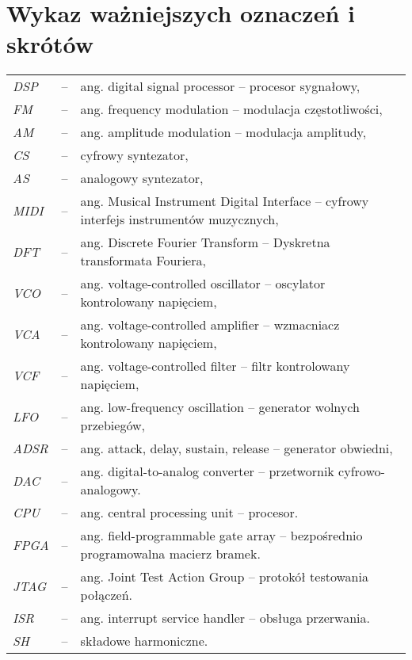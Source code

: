 \chapter*{Wykaz ważniejszych oznaczeń i skrótów}

\begin{tabular}{lcl}
	\textit{DSP} & -- & ang. digital signal processor -- procesor sygnałowy, \\
	\textit{FM} & -- & ang. frequency modulation -- modulacja częstotliwości, \\
	\textit{AM} & -- & ang. amplitude modulation -- modulacja amplitudy, \\
	\textit{CS} & -- & cyfrowy syntezator, \\
	\textit{AS} & -- & analogowy syntezator, \\
	\textit{MIDI} & -- & ang. Musical Instrument Digital Interface -- cyfrowy interfejs instrumentów muzycznych, \\
	\textit{DFT} & -- & ang. Discrete Fourier Transform -- Dyskretna transformata Fouriera, \\
	\textit{VCO} & -- & ang. voltage-controlled oscillator -- oscylator kontrolowany napięciem, \\
	\textit{VCA} & -- & ang. voltage-controlled amplifier -- wzmacniacz kontrolowany napięciem, \\
	\textit{VCF} & -- & ang. voltage-controlled filter -- filtr kontrolowany napięciem, \\
	\textit{LFO} & -- & ang. low-frequency oscillation -- generator wolnych przebiegów, \\
	\textit{ADSR} & -- & ang. attack, delay, sustain, release -- generator obwiedni, \\
	\textit{DAC} & -- & ang. digital-to-analog converter -- przetwornik cyfrowo-analogowy. \\
	\textit{CPU} & -- & ang. central processing unit -- procesor. \\
	\textit{FPGA} & -- & ang. field-programmable gate array -- bezpośrednio programowalna macierz bramek. \\
	\textit{JTAG} & -- & ang. Joint Test Action Group -- protokół testowania połączeń. \\
	\textit{ISR} & -- & ang. interrupt service handler -- obsługa przerwania. \\
	\textit{SH} & -- & składowe harmoniczne. \\
\end{tabular} 
